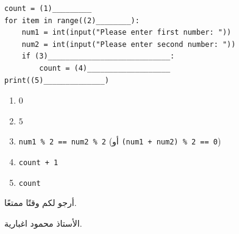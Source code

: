 \documentclass[14pt]{extarticle}
\begin{document}
\begin{enumerate}[resume, label=\textbf{السؤال \arabic*:}, wide=0pt, itemsep=2.2em]
\begin{boxCode}
\begin{english}
\begin{verbatim}
count = (1)_________
for item in range((2)________):
    num1 = int(input("Please enter first number: "))
    num2 = int(input("Please enter second number: "))
    if (3)____________________________:
        count = (4)___________________
print((5)______________)
\end{verbatim}
\end{english}
\end{boxCode}

\ifwithsols
\begin{boxSolution}
\begin{enumerate}[label=(\arabic*)]
\item $0$
\item $5$
\item \textenglish{\texttt{num1 \% 2 == num2 \% 2}} (أو \textenglish{\texttt{(num1 + num2) \% 2 == 0}})
\item \textenglish{\texttt{count + 1}}
\item \textenglish{\texttt{count}}
\end{enumerate}
\end{boxSolution}
\fi
\filbreak

\end{enumerate}

\vspace{1cm}
\begin{flushleft}
أرجو لكم وقتًا ممتعًا.

الأستاذ محمود اغبارية.
\end{flushleft}
\end{document}
